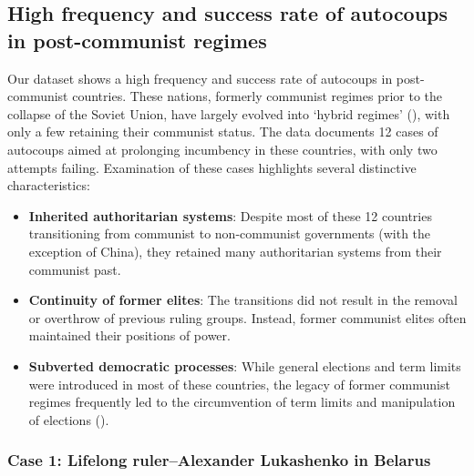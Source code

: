 \documentclass[
  12pt,
]{report}
\begin{document}
\subsection{High frequency and success rate of autocoups in
post-communist
regimes}\label{high-frequency-and-success-rate-of-autocoups-in-post-communist-regimes}

Our dataset shows a high frequency and success rate of autocoups in
post-communist countries. These nations, formerly communist regimes
prior to the collapse of the Soviet Union, have largely evolved into
`hybrid regimes' (), with only a few retaining their communist status. The data
documents 12 cases of autocoups aimed at prolonging incumbency in these
countries, with only two attempts failing. Examination of these cases
highlights several distinctive characteristics:

\begin{itemize}
\item
  \textbf{Inherited authoritarian systems}: Despite most of these 12
  countries transitioning from communist to non-communist governments
  (with the exception of China), they retained many authoritarian
  systems from their communist past.
\item
  \textbf{Continuity of former elites}: The transitions did not result
  in the removal or overthrow of previous ruling groups. Instead, former
  communist elites often maintained their positions of power.
\item
  \textbf{Subverted democratic processes}: While general elections and
  term limits were introduced in most of these countries, the legacy of
  former communist regimes frequently led to the circumvention of term
  limits and manipulation of elections
  ().
\end{itemize}

\subsubsection*{Case 1: Lifelong ruler--Alexander Lukashenko in
Belarus}\label{case-1-lifelong-ruleralexander-lukashenko-in-belarus}
\end{document}
